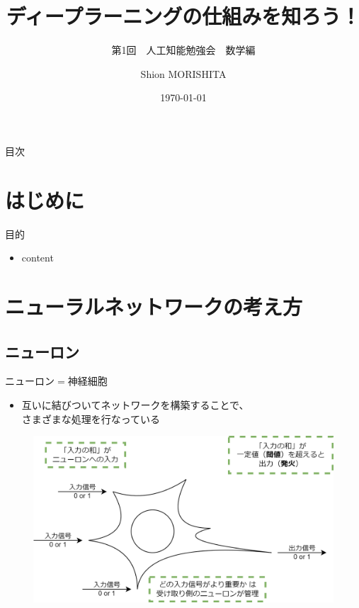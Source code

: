 \documentclass[dvipdfmx,aspectratio=169]{beamer}
\title{ディープラーニングの仕組みを知ろう！}
\subtitle{第1回　人工知能勉強会　数学編}
\author{Shion MORISHITA}
\institute{}
\date{\today}
\begin{document}
	\begin{frame}[plain]
	    \maketitle
	\end{frame}
		
	\begin{frame}[shrink]{目次}
		\vspace{1em}
		\tableofcontents
	\end{frame}
	
	\section{はじめに}
	\begin{frame}{目的}
		\begin{itemize}
			\item content
		\end{itemize}
	\end{frame}

	\section{ニューラルネットワークの考え方}
	\subsection{ニューロン}
	\begin{frame}{ニューロン$ = $神経細胞}
		\begin{itemize}
			\item 互いに結びついてネットワークを構築することで、\\さまざまな処理を行なっている
		\end{itemize}

		\begin{figure}
			\centering
			\includegraphics[width=0.6\linewidth]{ニューロンの働き}
		\end{figure}
	\end{frame}
	
\end{document}
